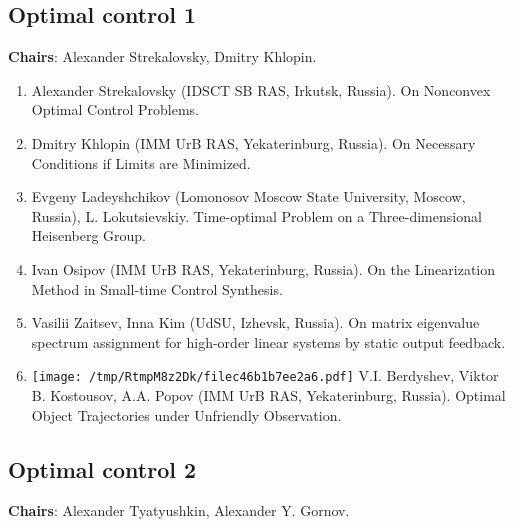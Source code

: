 \documentclass[
]{article}
\providecommand{\tightlist}{%
  \setlength{\itemsep}{0pt}\setlength{\parskip}{0pt}}
\begin{document}
\hypertarget{oc1}{%
\subsection{Optimal control 1}\label{oc1}}

\textbf{Chairs}: Alexander Strekalovsky, Dmitry Khlopin.

\begin{enumerate}
\def\labelenumi{\arabic{enumi}.}
\tightlist
\item
  Alexander Strekalovsky (IDSCT SB RAS, Irkutsk, Russia). On Nonconvex
  Optimal Control Problems.
\item
  Dmitry Khlopin (IMM UrB RAS, Yekaterinburg, Russia). On Necessary
  Conditions if Limits are Minimized.
\item
  Evgeny Ladeyshchikov (Lomonosov Moscow State University, Moscow,
  Russia), L. Lokutsievskiy. Time-optimal Problem on a Three-dimensional
  Heisenberg Group.
\item
  Ivan Osipov (IMM UrB RAS, Yekaterinburg, Russia). On the Linearization
  Method in Small-time Control Synthesis.
\item
  Vasilii Zaitsev, Inna Kim (UdSU, Izhevsk, Russia). On matrix
  eigenvalue spectrum assignment for high-order linear systems by static
  output feedback.
\item
  \protect\texttt{[image: /tmp/RtmpM8z2Dk/filec46b1b7ee2a6.pdf]}
  V.I. Berdyshev, Viktor B. Kostousov, A.A. Popov (IMM UrB RAS,
  Yekaterinburg, Russia). Optimal Object Trajectories under Unfriendly
  Observation.
\end{enumerate}

\hypertarget{oc2}{%
\subsection{Optimal control 2}\label{oc2}}

\textbf{Chairs}: Alexander Tyatyushkin, Alexander Y. Gornov.
\end{document}
